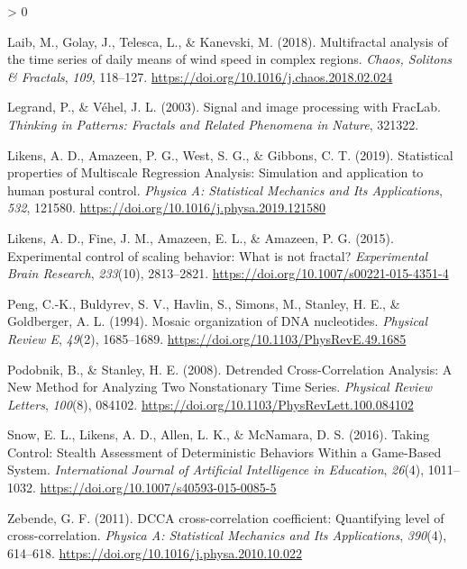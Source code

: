 \documentclass[
  english,
  man]{apa6}
\newlength{\cslhangindent}
\newenvironment{CSLReferences}[2] %
 {%
  \setlength{\parindent}{0pt}
  \ifodd #1 \everypar{\setlength{\hangindent}{\cslhangindent}}\ignorespaces\fi
  \ifnum #2 > 0
  \setlength{\parskip}{#2\baselineskip}
  \fi
 }%
 {}
\begin{document}
\begin{CSLReferences}{1}{0}
\leavevmode\hypertarget{ref-laibMultifractalAnalysisTime2018}{}%
Laib, M., Golay, J., Telesca, L., \& Kanevski, M. (2018). Multifractal analysis of the time series of daily means of wind speed in complex regions. \emph{Chaos, Solitons \& Fractals}, \emph{109}, 118--127. \url{https://doi.org/10.1016/j.chaos.2018.02.024}

\leavevmode\hypertarget{ref-legrand2003}{}%
Legrand, P., \& Véhel, J. L. (2003). Signal and image processing with FracLab. \emph{Thinking in Patterns: Fractals and Related Phenomena in Nature}, 321322.

\leavevmode\hypertarget{ref-likensStatisticalPropertiesMultiscale2019}{}%
Likens, A. D., Amazeen, P. G., West, S. G., \& Gibbons, C. T. (2019). Statistical properties of {Multiscale} {Regression} {Analysis}: {Simulation} and application to human postural control. \emph{Physica A: Statistical Mechanics and Its Applications}, \emph{532}, 121580. \url{https://doi.org/10.1016/j.physa.2019.121580}

\leavevmode\hypertarget{ref-likensExperimentalControlScaling2015}{}%
Likens, A. D., Fine, J. M., Amazeen, E. L., \& Amazeen, P. G. (2015). Experimental control of scaling behavior: What is not fractal? \emph{Experimental Brain Research}, \emph{233}(10), 2813--2821. \url{https://doi.org/10.1007/s00221-015-4351-4}

\leavevmode\hypertarget{ref-pengMosaicOrganizationDNA1994}{}%
Peng, C.-K., Buldyrev, S. V., Havlin, S., Simons, M., Stanley, H. E., \& Goldberger, A. L. (1994). Mosaic organization of {DNA} nucleotides. \emph{Physical Review E}, \emph{49}(2), 1685--1689. \url{https://doi.org/10.1103/PhysRevE.49.1685}

\leavevmode\hypertarget{ref-podobnikDetrendedCrossCorrelationAnalysis2008}{}%
Podobnik, B., \& Stanley, H. E. (2008). Detrended {Cross}-{Correlation} {Analysis}: {A} {New} {Method} for {Analyzing} {Two} {Nonstationary} {Time} {Series}. \emph{Physical Review Letters}, \emph{100}(8), 084102. \url{https://doi.org/10.1103/PhysRevLett.100.084102}

\leavevmode\hypertarget{ref-snow2016}{}%
Snow, E. L., Likens, A. D., Allen, L. K., \& McNamara, D. S. (2016). Taking Control: Stealth Assessment of Deterministic Behaviors Within a Game-Based System. \emph{International Journal of Artificial Intelligence in Education}, \emph{26}(4), 1011--1032. \url{https://doi.org/10.1007/s40593-015-0085-5}

\leavevmode\hypertarget{ref-zebendeDCCACrosscorrelationCoefficient2011}{}%
Zebende, G. F. (2011). {DCCA} cross-correlation coefficient: {Quantifying} level of cross-correlation. \emph{Physica A: Statistical Mechanics and Its Applications}, \emph{390}(4), 614--618. \url{https://doi.org/10.1016/j.physa.2010.10.022}

\end{CSLReferences}

\endgroup
\end{document}
